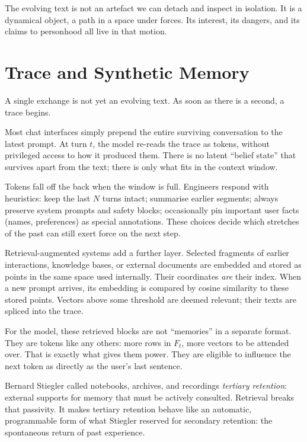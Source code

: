 \documentclass[12pt,a4paper]{article}
\begin{document}
The evolving text is not an artefact we can detach and inspect in isolation. It is a dynamical object, a path in a space under forces. Its interest, its dangers, and its claims to personhood all live in that motion.


\section{Trace and Synthetic Memory}

A single exchange is not yet an evolving text. As soon as there is a second, a trace begins.

Most chat interfaces simply prepend the entire surviving conversation to the latest prompt. At turn $t$, the model re-reads the trace as tokens, without privileged access to how it produced them. There is no latent ``belief state'' that survives apart from the text; there is only what fits in the context window.

Tokens fall off the back when the window is full. Engineers respond with heuristics: keep the last $N$ turns intact; summarise earlier segments; always preserve system prompts and safety blocks; occasionally pin important user facts (names, preferences) as special annotations. These choices decide which stretches of the past can still exert force on the next step.

Retrieval-augmented systems add a further layer. Selected fragments of earlier interactions, knowledge bases, or external documents are embedded and stored as points in the same space used internally. Their coordinates \emph{are} their index. When a new prompt arrives, its embedding is compared by cosine similarity to these stored points. Vectors above some threshold are deemed relevant; their texts are spliced into the trace.

For the model, these retrieved blocks are not ``memories'' in a separate format. They are tokens like any others: more rows in $F_t$, more vectors to be attended over. That is exactly what gives them power. They are eligible to influence the next token as directly as the user's last sentence.

Bernard Stiegler called notebooks, archives, and recordings \emph{tertiary retention}: external supports for memory that must be actively consulted.\cite{stiegler2009technics} Retrieval breaks that passivity. It makes tertiary retention behave like an automatic, programmable form of what Stiegler reserved for secondary retention: the spontaneous return of past experience.
\end{document}
